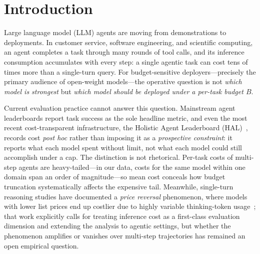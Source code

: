 \documentclass[preprint,authoryear,12pt]{elsarticle}
\begin{document}
\section{Introduction}
\label{sec:introduction}
Large language model (LLM) agents are moving from demonstrations to deployments. In customer service, software engineering, and scientific computing, an agent completes a task through many rounds of tool calls, and its inference consumption accumulates with every step: a single agentic task can cost tens of times more than a single-turn query. For budget-sensitive deployers---precisely the primary audience of open-weight models---the operative question is not \emph{which model is strongest} but \emph{which model should be deployed under a per-task budget $B$}.

Current evaluation practice cannot answer this question. Mainstream agent leaderboards report task success as the sole headline metric, and even the most recent cost-transparent infrastructure, the Holistic Agent Leaderboard (HAL)~\cite{kapoor2025holisticagentleaderboard}, records cost \emph{post hoc} rather than imposing it as a \emph{prospective constraint}: it reports what each model spent without limit, not what each model could still accomplish under a cap. The distinction is not rhetorical. Per-task costs of multi-step agents are heavy-tailed---in our data, costs for the same model within one domain span an order of magnitude---so mean cost conceals how budget truncation systematically affects the expensive tail. Meanwhile, single-turn reasoning studies have documented a \emph{price reversal} phenomenon, where models with lower list prices end up costlier due to highly variable thinking-token usage~\cite{chen2026pricereversal}; that work explicitly calls for treating inference cost as a first-class evaluation dimension and extending the analysis to agentic settings, but whether the phenomenon amplifies or vanishes over multi-step trajectories has remained an open empirical question.
\end{document}
